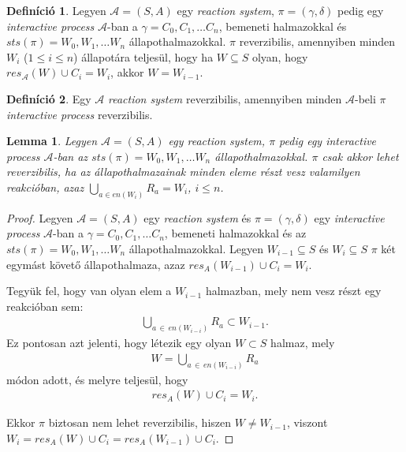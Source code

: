 \documentclass[12pt]{article}
\theoremstyle{definition}
\newtheorem*{definition*}{Definíció}
\theoremstyle{remark}
\theoremstyle{plain}
\theoremstyle{plain}
\newtheorem*{lemma*}{Lemma}
\newcommand{\res}{\textit{res}}
\begin{document}
    \begin{definition*}
        Legyen $\mathscr{A} = (S, A)$ egy \textit{reaction system}, $\pi=(\gamma, \delta)$ pedig egy \textit{interactive process} $\mathscr{A}$-ban a $\gamma = C_{0}, C_{1}, \ldots C_{n}$, bemeneti halmazokkal és $\textit{sts}(\pi)=W_{0},W_{1},\ldots W_{n}$ állapothalmazokkal. $\pi$ reverzibilis, amennyiben minden $W_{i}$ ($1 \leq i \leq n$) állapotára teljesül, hogy ha $W \subseteq S$ olyan, hogy $res_{\mathscr{A}}(W) \cup C_{i} = W_{i}$, akkor $W = W_{i - 1}$.
    \end{definition*}

    \begin{definition*}
        Egy $\mathscr{A}$ \textit{reaction system} reverzibilis, amennyiben minden $\mathscr{A}$-beli $\pi$ \textit{interactive process} reverzibilis.
    \end{definition*}

    \begin{lemma*}
        Legyen $\mathscr{A} = (S, A)$ egy \textit{reaction system}, $\pi$ pedig egy \textit{interactive process} $\mathscr{A}$-ban az $\textit{sts}(\pi)=W_{0},W_{1},\ldots W_{n}$ állapothalmazokkal. $\pi$ csak akkor lehet reverzibilis, ha az állapothalmazainak minden eleme részt vesz valamilyen reakcióban, azaz $\bigcup_{a \in \textit{en}(W_{i})} R_{a} = W_{i}$, $i \leq n$.
    \end{lemma*}

    \begin{proof}
        Legyen $\mathscr{A} = (S, A)$ egy \textit{reaction system} és $\pi=(\gamma, \delta)$ egy \textit{interactive process} $\mathscr{A}$-ban a $\gamma = C_{0}, C_{1}, \ldots C_{n}$, bemeneti halmazokkal és az $\textit{sts}(\pi)=W_{0},W_{1},\ldots W_{n}$ állapothalmazokkal. Legyen $W_{i - 1} \subseteq S$ és $W_{i} \subseteq S$ $\pi$ két egymást követő állapothalmaza, azaz $\res_{A}(W_{i-1}) \cup C_{i}=W_{i}$.
        
        Tegyük fel, hogy van olyan elem a $W_{i-1}$ halmazban, mely nem vesz részt egy reakcióban sem:
        \begin{align*}
            \bigcup_{a \,\in\, \textit{en}(W_{i-i})} R_{a} \subset W_{i-1}.
        \end{align*}
        Ez pontosan azt jelenti, hogy létezik egy olyan $W \subset S$ halmaz, mely
        \begin{align*}
            W = \bigcup_{a \,\in\, \textit{en}(W_{i-i})} R_{a}
        \end{align*}
        módon adott, és melyre teljesül, hogy
        \begin{align*}
            \res_{A}(W) \cup C_{i} = W_{i}.
        \end{align*}

        Ekkor $\pi$ biztosan nem lehet reverzibilis, hiszen $W \neq W_{i - 1}$, viszont $W_{i} = \res_{A}(W) \cup C_{i} = \res_{A}(W_{i - 1}) \cup C_{i}$.
    \end{proof}
\end{document}
